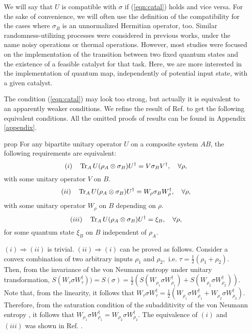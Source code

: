 \documentclass[aps, reprint, amsmath,amssymb, prx, superscriptaddress]{revtex4-2}
\begin{document}
We will say that $U$ is compatible with $\sigma$ if (\ref{eqn:catal}) holds and vice versa.  For the sake of convenience, we will often use the definition of the compatibility for the cases where $\sigma_B$ is an unnormalized Hermitian operator, too. Similar randomness-utilizing processes were considered in previous works, under the name noisy operations \cite{horodecki2003reversible, scharlau2018quantum, gour2015resource} or thermal operations. However, most studies were focused on the implementation of the transition between two fixed quantum states and the existence of a feasible catalyst for that task. Here, we are more interested in the implementation of quantum map, independently of potential input state, with a given catalyst.

The condition (\ref{eqn:catal}) may look too strong, but actually it is equivalent to an apparently weaker conditions. We refine the result of Ref. \cite{lie2020uniform} to get the following equivalent conditions. All the omitted proofs of results can be found in Appendix \ref{appendix}.
\begin{theoremEnd}{prop} \label{prop:charac}
    For any bipartite unitary operator $U$ on a composite system $AB$, the following requirements are equivalent:
    \begin{equation*}
       (i)\quad \Tr_A U(\rho_{A} \otimes \sigma_{B})U^\dag = V\sigma_{B}V^\dag, \quad\forall \rho,
    \end{equation*}
    with some unitary operator $V$ on $B$. 
    \begin{equation*}
        (ii) \quad \Tr_A U(\rho_{A} \otimes \sigma_{B})U^\dag = W_\rho\sigma_{B}W_\rho^\dag, \quad\forall \rho,
    \end{equation*}
    with some unitary operator $W_\rho$ on $B$ depending on $\rho$. 
    \begin{equation*}
        (iii) \quad \Tr_A U(\rho_{A} \otimes \sigma_{B})U^\dag = \xi_B, \quad\forall \rho,
    \end{equation*}
    for some quantum state $\xi_B$ on $B$ independent of $\rho_A$.
\end{theoremEnd}
\begin{proofEnd}
    $(i)\Rightarrow(ii)$ is trivial. $(ii)\Rightarrow(i)$ can be proved as follows. Consider a convex combination of two arbitrary inputs $\rho_1$ and $\rho_2,$ i.e. $\tau=\frac{1}{2}(\rho_1+\rho_2)$. Then, from the invariance of the von Neumann entropy under unitary transformation, $S(W_{\tau}\sigma W_{\tau}^\dag))=S(\sigma)=\frac{1}{2}(S(W_{\rho_1}\sigma W_{\rho_1}^\dag) +S(W_{\rho_2}\sigma W_{\rho_2}^\dag))$. Note that, from the linearity, it follows that $W_\tau\sigma W_\tau^\dag=\frac{1}{2}(W_{\rho_1}\sigma W_{\rho_1}^\dag +W_{\rho_2}\sigma W_{\rho_2}^\dag)$. Therefore, from the saturation condition of the subadditivity of the von Neumann entropy \cite{nielsen2002quantum}, it follows that $W_{\rho_1}\sigma W_{\rho_1}^\dag=W_{\rho_2}\sigma W_{\rho_2}^\dag$. The equivalence of $(i)$ and $(iii)$ was shown in Ref. \cite{lie2020uniform}.
\end{proofEnd}
\end{document}
